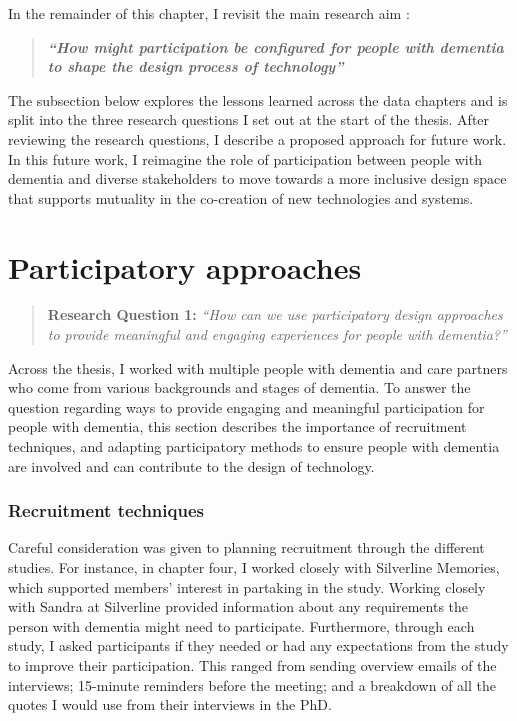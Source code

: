 In the remainder of this chapter, I revisit the main research aim :
\begin{quote}
\textbf{\textit{``How might participation be configured for people with dementia to shape the design process of technology''}}
\end{quote}

The subsection below explores the lessons learned across the data chapters and is split into the three research questions I set out at the start of the thesis. After reviewing the research questions, I describe a proposed approach for future work. In this future work, I reimagine the role of participation between people with dementia and diverse stakeholders to move towards a more inclusive design space that supports mutuality in the co-creation of new technologies and systems. 

\section{Participatory approaches}
\label{Discussion:RQ1}
\begin{quote}
\textbf{    Research Question 1:
}    
\textit{    “How can we use participatory design approaches to provide meaningful and engaging experiences for people with dementia?”}
\end{quote}

Across the thesis, I worked with multiple people with dementia and care partners who come from various backgrounds and stages of dementia. To answer the question regarding ways to provide engaging and meaningful participation for people with dementia, this section describes the importance of recruitment techniques, and adapting participatory methods to ensure people with dementia are involved and can contribute to the design of technology. 

\subsubsection{Recruitment techniques}
\label{RecruitmentTechniques}
Careful consideration was given to planning recruitment through the different studies. For instance, in chapter four, I worked closely with Silverline Memories, which supported members' interest in partaking in the study. Working closely with Sandra at Silverline provided information about any requirements the person with dementia might need to participate. Furthermore, through each study, I asked participants if they needed or had any expectations from the study to improve their participation. This ranged from sending overview emails of the interviews; 15-minute reminders before the meeting; and a breakdown of all the quotes I would use from their interviews in the PhD.

